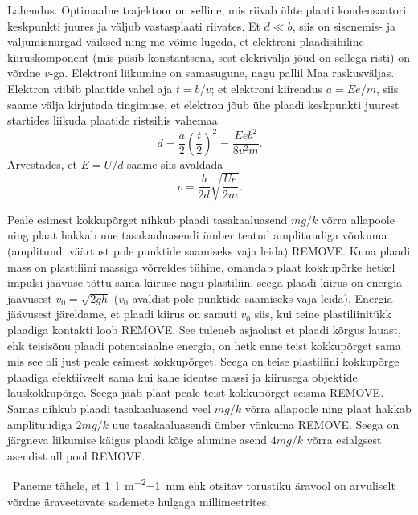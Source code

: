 \documentclass[10pt]{article}
\newcommand{\p}[1]{REMOVE}
\begin{document}

\solu
Lahendus. Optimaalne trajektoor on selline, mis riivab ühte plaati kondensaatori keskpunkti juures ja väljub vastasplaati riivates. Et $d\ll b$, siis on sisenemis- ja väljumisnurgad väiksed ning me võime lugeda, et elektroni plaadisihiline kiiruskomponent (mis püsib konstantsena, sest elekrivälja jõud on sellega risti) on võrdne $v$-ga. Elektroni liikumine on samasugune, nagu pallil Maa raskusväljas. Elektron viibib plaatide vahel aja $t=b/v$; et elektroni kiirendus $a=Ee/m$, siis saame välja kirjutada tingimuse, et elektron jõub ühe plaadi keskpunkti juurest startides liikuda plaatide ristsihis vahemaa $$d=\frac a2\left(\frac t2\right)^2=\frac{Eeb^2}{8v^2m}.$$ Arvestades, et $E=U/d$ saame siis avaldada $$v=\frac b{2d}\sqrt{\frac{Ue}{2m}}.$$
\probend
\bigskip


\solu
Peale esimest kokkupõrget nihkub plaadi tasakaaluasend $mg/k$ võrra allapoole ning plaat hakkab uue tasakaaluasendi ümber teatud amplituudiga võnkuma (amplituudi väärtust pole punktide saamiseks vaja leida) \p3. Kuna plaadi mass on plastiliini massiga võrreldes tühine, omandab plaat kokkupõrke hetkel impulsi jäävuse tõttu sama kiiruse nagu plastiliin, seega plaadi kiirus on energia jäävusest $v_0 = \sqrt{2gh}$ ($v_0$ avaldist pole punktide saamiseks vaja leida). Energia jäävusest järeldame, et plaadi kiirus on samuti $v_0$ siis, kui teine plastiliinitükk plaadiga kontakti loob \p2. See tuleneb asjaolust et plaadi kõrgus lauast, ehk teisisõnu plaadi potentsiaalne energia, on hetk enne teist kokkupõrget sama mis see oli just peale esimest kokkupõrget. Seega on teise plastiliini kokkupõrge plaadiga efektiivselt sama kui kahe identse massi ja kiirusega objektide lauskokkupõrge. Seega jääb plaat peale teist kokkupõrget seisma \p2. Samas nihkub plaadi tasakaaluasend veel $mg/k$ võrra allapoole ning plaat hakkab amplituudiga $2mg/k$ uue tasakaaluasendi ümber võnkuma \p2. Seega on järgneva liikumise käigus plaadi kõige alumine asend $4mg/k$ võrra esialgsest asendist all pool \p1.
\probend
\bigskip


\solu
\
Paneme tähele, et \SI{1}{l\per m^2}=\SI{1}{mm} ehk otsitav torustiku äravool on arvuliselt võrdne äraveetavate sademete hulgaga millimeetrites.
\end{document}

